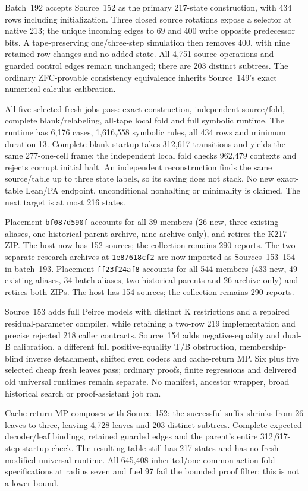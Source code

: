 \documentclass[11pt]{article}
\begin{document}
{Batch~192 accepts Source~152 as the primary 217-state construction, with
434 rows including initialization. Three closed source rotations expose a
selector at native 213; the unique incoming edges to 69 and 400 write opposite
predecessor bits. A tape-preserving one/three-step simulation then removes
400, with nine retained-row changes and no added state. All 4,751 source
operations and guarded control edges remain unchanged; there are 203 distinct
subtrees. The ordinary ZFC-provable consistency equivalence inherits Source~149's
exact numerical-calculus calibration.

All five selected fresh jobs pass: exact construction, independent source/fold,
complete blank/relabeling, all-tape local fold and full symbolic runtime.
The runtime has 6,176 cases, 1,616,558 symbolic rules, all 434 rows and minimum
duration 13. Complete blank startup takes 312,617 transitions and yields the
same 277-one-cell frame; the independent local fold checks 962,479 contexts
and rejects corrupt initial halt. An independent reconstruction finds the same
source/table up to three state labels, so its saving does not stack.
No new exact-table Lean/PA endpoint, unconditional nonhalting or minimality
is claimed. The next target is at most 216 states.

Placement \texttt{bf087d590f} accounts for all 39 members (26 new, three existing
aliases, one historical parent archive, nine archive-only), and retires the
K217 ZIP. The host now has 152 sources; the collection remains 290 reports.
The two separate research archives at \texttt{1e87618cf2} are now imported
as Sources~153--154 in batch~193. Placement \texttt{ff23f24af8} accounts for
all 544 members (433 new, 49 existing aliases, 34 batch aliases, two historical
parents and 26 archive-only) and retires both ZIPs. The host has 154 sources;
the collection remains 290 reports.

Source~153 adds full Peirce models with distinct K restrictions and a repaired
residual-parameter compiler, while retaining a two-row 219 implementation and
precise rejected 218 caller contracts. Source~154 adds negative-equality and
dual-B calibration, a different full positive-equality T/B obstruction,
membership-blind inverse detachment, shifted even codecs and cache-return MP.
Six plus five selected cheap fresh leaves pass; ordinary proofs, finite
regressions and delivered old universal runtimes remain separate. No manifest,
ancestor wrapper, broad historical search or proof-assistant job ran.

Cache-return MP composes with Source~152: the successful suffix shrinks from
26 leaves to three, leaving 4,728 leaves and 203 distinct subtrees. Complete
expected decoder/leaf bindings, retained guarded edges and the parent's entire
312,617-step startup check. The resulting table still has 217 states and has
no fresh modified universal runtime. All 645,408 inherited/one-common-action
fold specifications at radius seven and fuel 97 fail the bounded proof filter;
this is not a lower bound.

}
\end{document}
